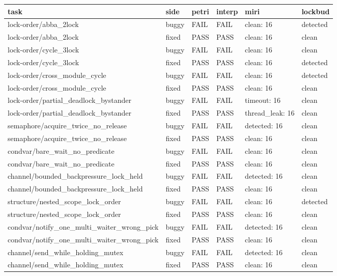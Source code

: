 \begin{tabular}{llllll}
\toprule
\textbf{task} & \textbf{side} & \textbf{petri} & \textbf{interp} & \textbf{miri} & \textbf{lockbud} \\
\midrule
lock-order/abba\_2lock & buggy & FAIL & FAIL & clean: 16 & detected \\
lock-order/abba\_2lock & fixed & PASS & PASS & clean: 16 & clean \\
lock-order/cycle\_3lock & buggy & FAIL & FAIL & clean: 16 & clean \\
lock-order/cycle\_3lock & fixed & PASS & PASS & clean: 16 & detected \\
lock-order/cross\_module\_cycle & buggy & FAIL & FAIL & clean: 16 & detected \\
lock-order/cross\_module\_cycle & fixed & PASS & PASS & clean: 16 & clean \\
lock-order/partial\_deadlock\_bystander & buggy & FAIL & FAIL & timeout: 16 & clean \\
lock-order/partial\_deadlock\_bystander & fixed & PASS & PASS & thread\_leak: 16 & clean \\
semaphore/acquire\_twice\_no\_release & buggy & FAIL & FAIL & detected: 16 & clean \\
semaphore/acquire\_twice\_no\_release & fixed & PASS & PASS & clean: 16 & clean \\
condvar/bare\_wait\_no\_predicate & buggy & FAIL & FAIL & clean: 16 & clean \\
condvar/bare\_wait\_no\_predicate & fixed & PASS & PASS & clean: 16 & clean \\
channel/bounded\_backpressure\_lock\_held & buggy & FAIL & FAIL & detected: 16 & clean \\
channel/bounded\_backpressure\_lock\_held & fixed & PASS & PASS & clean: 16 & clean \\
structure/nested\_scope\_lock\_order & buggy & FAIL & FAIL & clean: 16 & detected \\
structure/nested\_scope\_lock\_order & fixed & PASS & PASS & clean: 16 & clean \\
condvar/notify\_one\_multi\_waiter\_wrong\_pick & buggy & FAIL & FAIL & detected: 16 & clean \\
condvar/notify\_one\_multi\_waiter\_wrong\_pick & fixed & PASS & PASS & clean: 16 & clean \\
channel/send\_while\_holding\_mutex & buggy & FAIL & FAIL & detected: 16 & clean \\
channel/send\_while\_holding\_mutex & fixed & PASS & PASS & clean: 16 & clean \\
\bottomrule
\end{tabular}

